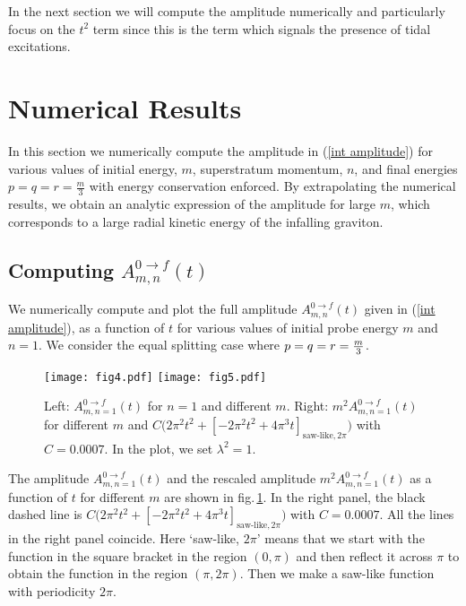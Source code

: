 \documentclass[11pt]{article}
\begin{document}
In the next section we will compute the amplitude numerically and particularly focus on the $t^2$ term since this is the term which signals the presence of tidal excitations.

\section{Numerical Results}\label{sec 5}

In this section we numerically compute the amplitude in (\ref{int amplitude}) for various values of initial energy, $m$, superstratum momentum, $n$, and final energies $p=q=r=\frac{m}{3}$ with energy conservation enforced. 
By extrapolating the numerical results, we obtain an analytic expression of the amplitude for large $m$, which corresponds to a large radial kinetic energy of the infalling graviton.



\subsection{Computing $A^{0\to f}_{m,n}(t)$}

We numerically compute and plot the full amplitude $A^{0\to f}_{m,n}(t)$ given in (\ref{int amplitude}), as a function of $t$ for various values of initial probe energy $m$ and $n=1$. We consider the equal splitting case where $p=q=r={m\over3}$. 
%
\begin{figure}
\centering
        \texttt{[image: fig4.pdf]}\quad
       \texttt{[image: fig5.pdf]}
\caption{Left: $A^{0\to f}_{m,n=1}(t)$ for $n=1$ and different $m$. Right: $m^2 A^{0\to f}_{m,n=1}(t)$ for different $m$ and $C \Big( 2\pi^2t^2  + \left[-2 \pi^2 t^2 +4\pi^3t\right]_{\text{saw-like},2\pi}\Big)$ with $C=0.0007$. In the plot, we set $\lambda^2=1$.}
\label{fig_amp}
\end{figure}
The amplitude $A^{0\to f}_{m,n=1}(t)$ and the rescaled amplitude $m^2A^{0\to f}_{m,n=1}(t)$ as a function of $t$ for different $m$ are shown in fig.\,\ref{fig_amp}. In the right panel, the black dashed line is $C \Big( 2\pi^2t^2  + \left[-2 \pi^2 t^2 +4\pi^3t\right]_{\text{saw-like},2\pi}\Big)$ with $C=0.0007$. All the lines in the right panel coincide. 
Here `saw-like, $2\pi$' means that we start with the function in the square bracket in the region $(0,\pi)$ and then reflect it across $\pi$ to obtain the function in the region $(\pi,2\pi)$. Then we make a saw-like function with periodicity $2\pi$.
\end{document}

